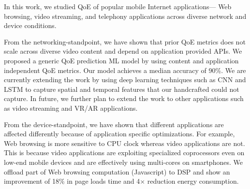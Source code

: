 In this work, we studied QoE of popular mobile Internet applications--- Web browsing, video streaming, and telephony applications across diverse network and device conditions.

From the networking-standpoint, we have shown that prior QoE metrics does not scale across diverse video content and depend on application provided APIs. 
We proposed a generic QoE prediction ML model by using content and application independent QoE metrics.
Our model achieves a median accuracy of 90\%.
We are currently extending the work by using deep learning techniques such as CNN and LSTM to capture spatial and temporal features that our handcrafted could not capture. 
In future, we further plan to extend the work to other applications such as video streaming and VR/AR applications.

From the device-standpoint, we have shown that different applications are affected differently because of application specific optimizations.
For example, Web browsing is more sensitive to CPU clock whereas video applications are not. 
This is because video applications are exploiting specialized coprocessors even on low-end mobile devices and are effectively using multi-cores on smartphones.
We offload part of Web browsing computation (Javascript) to DSP and show an improvement of 18\% in page loads time and 4$\times$ reduction energy consumption.


